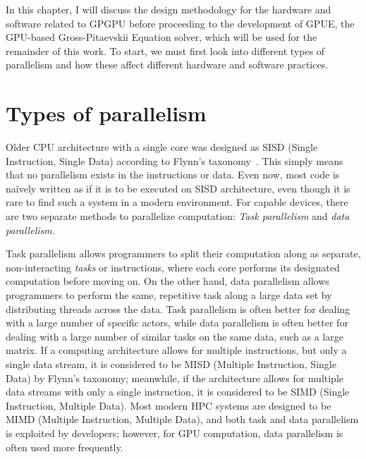 In this chapter, I will discuss the design methodology for the hardware and software related to GPGPU before proceeding to the development of GPUE, the GPU-based Gross-Pitaevskii Equation solver, which will be used for the remainder of this work.
To start, we must first look into different types of parallelism and how these affect different hardware and software practices.

\section{Types of parallelism}

Older CPU architecture with a single core was designed as SISD (Single Instruction, Single Data) according to Flynn's taxonomy~\cite{gurd1988}. 
This simply means that no parallelism exists in the instructions or data.
Even now, most code is na\"ively written as if it is to be executed on SISD architecture, even though it is rare to find such a system in a modern environment.
For capable devices, there are two separate methods to parallelize computation: \textit{Task parallelism} and \textit{data parallelism}.

Task parallelism allows programmers to split their computation along as separate, non-interacting \textit{tasks} or instructions, where each core performs its designated computation before moving on.
On the other hand, data parallelism allows programmers to perform the same, repetitive task along a large data set by distributing threads across the data.
Task parallelism is often better for dealing with a large number of specific actors, while data parallelism is often better for dealing with a large number of similar tasks on the same data, such as a large matrix.
If a computing architecture allows for multiple instructions, but only a single data stream, it is considered to be MISD (Multiple Instruction, Single Data) by Flynn's taxonomy; meanwhile, if the architecture allows for multiple data streams with only a single instruction, it is considered to be SIMD (Single Instruction, Multiple Data).
Most modern HPC systems are designed to be MIMD (Multiple Instruction, Multiple Data), and both task and data parallelism is exploited by developers; however, for GPU computation, data parallelism is often used more frequently.

